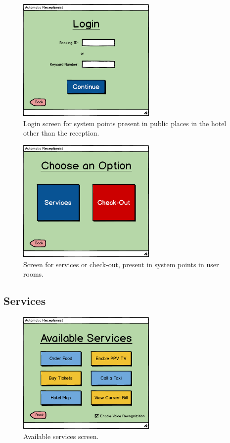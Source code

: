 \documentclass{article}
\begin{document}
\begin{figure}[H]
\centering
\includegraphics[width=0.6\textwidth]{Images/Services_2_Login.png}
\caption{Login screen for system points present in public places in the hotel other than the reception.}
\label{figBarLogin}
\end{figure}

\begin{figure}[H]
\centering
\includegraphics[width=0.6\textwidth]{Images/Services_3_Selection.png}
\caption{Screen for services or check-out, present in system points in user rooms.}
\label{figRoom}
\end{figure}

\subsection{Services}

\begin{figure}[H]
\centering
\includegraphics[width=0.6\textwidth]{Images/Services_4_Services.png}
\caption{Available services screen.}
\label{figServices}
\end{figure}
\end{document}
